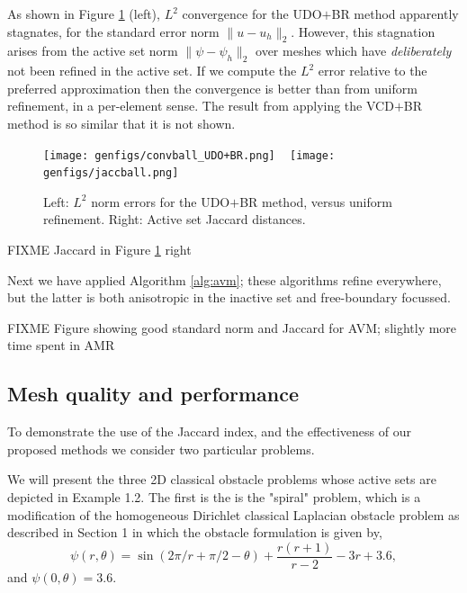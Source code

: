 \documentclass[]{interact}
\theoremstyle{plain}%
\theoremstyle{definition}
\theoremstyle{remark}
\begin{document}
As shown in Figure \ref{fig:ballconv} (left), $L^2$ convergence for the UDO$+$BR method apparently stagnates, for the standard error norm $\|u-u_h\|_2$.  However, this stagnation arises from the active set norm $\|\psi - \psi_h\|_2$ over meshes which have \emph{deliberately} not been refined in the active set.  If we compute the $L^2$ error relative to the preferred approximation then the convergence is better than from uniform refinement, in a per-element sense.  The result from applying the VCD$+$BR method is so similar that it is not shown.

\begin{figure}[ht]
\noindent\mbox{\texttt{[image: genfigs/convball\_UDO+BR.png]} \, \texttt{[image: genfigs/jaccball.png]}}
\caption{Left: $L^2$ norm errors for the UDO$+$BR method, versus uniform refinement.  Right: Active set Jaccard distances.}
\label{fig:ballconv}
\end{figure}

FIXME Jaccard in Figure \ref{fig:ballconv} right

Next we have applied Algorithm \ref{alg:avm}; these algorithms refine everywhere, but the latter is both anisotropic in the inactive set and free-boundary focussed.

FIXME Figure showing good standard norm and Jaccard for AVM; slightly more time spent in AMR

\subsection{Mesh quality and performance} \label{subsec:performance}


To demonstrate the use of the Jaccard index, and the effectiveness of our proposed methods we consider two particular problems. 




We will present the three 2D classical obstacle problems whose active sets are depicted in Example 1.2. The first is the is the "spiral" problem, which is a modification of the homogeneous Dirichlet classical Laplacian obstacle problem as described in Section 1 in which the obstacle formulation is given by, 
\begin{equation}
  \psi(r, \theta) = \sin(2\pi/r + \pi/2 - \theta) + \frac{r(r + 1)}{r - 2} - 3r + 3.6,
\end{equation}
and $\psi(0, \theta) = 3.6$. 
\end{document}
